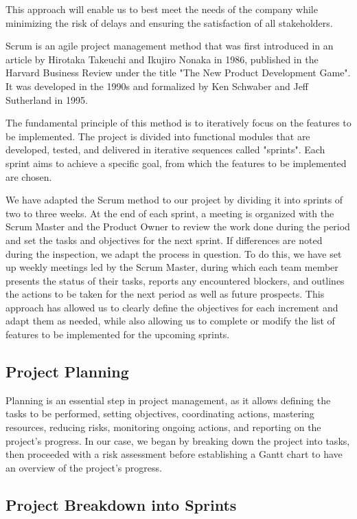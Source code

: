 This approach will enable us to best meet the needs of the company while minimizing the risk of delays and ensuring the satisfaction of all stakeholders.

Scrum is an agile project management method that was first introduced in an article by Hirotaka Takeuchi and Ikujiro Nonaka in 1986, published in the Harvard Business Review under the title "The New Product Development Game". It was developed in the 1990s and formalized by Ken Schwaber and Jeff Sutherland in 1995.

The fundamental principle of this method is to iteratively focus on the features to be implemented. The project is divided into functional modules that are developed, tested, and delivered in iterative sequences called "sprints". Each sprint aims to achieve a specific goal, from which the features to be implemented are chosen.

We have adapted the Scrum method to our project by dividing it into sprints of two to three weeks. At the end of each sprint, a meeting is organized with the Scrum Master and the Product Owner to review the work done during the period and set the tasks and objectives for the next sprint. If differences are noted during the inspection, we adapt the process in question. To do this, we have set up weekly meetings led by the Scrum Master, during which each team member presents the status of their tasks, reports any encountered blockers, and outlines the actions to be taken for the next period as well as future prospects. This approach has allowed us to clearly define the objectives for each increment and adapt them as needed, while also allowing us to complete or modify the list of features to be implemented for the upcoming sprints.

\subsection{Project Planning}
Planning is an essential step in project management, as it allows defining the tasks to be performed, setting objectives, coordinating actions, mastering resources, reducing risks, monitoring ongoing actions, and reporting on the project's progress. In our case, we began by breaking down the project into tasks, then proceeded with a risk assessment before establishing a Gantt chart to have an overview of the project's progress.

\subsection{Project Breakdown into Sprints}

